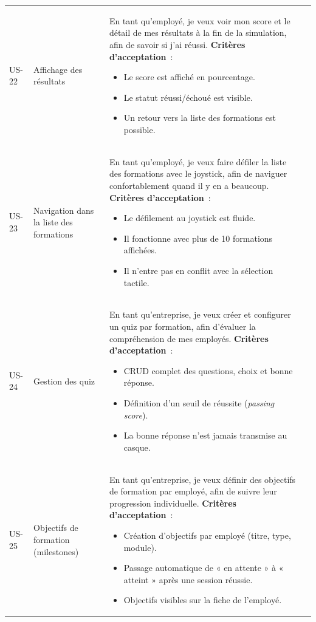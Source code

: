 \begin{longtable}{lp{2.8cm}p{8cm}l}
  US-22 & Affichage des résultats &
    En tant qu'employé, je veux voir mon score et le détail de mes
    résultats à la fin de la simulation, afin de savoir si j'ai
    réussi.
    \newline\textbf{Critères d'acceptation}~:
    \begin{itemize}
      \item Le score est affiché en pourcentage.
      \item Le statut réussi/échoué est visible.
      \item Un retour vers la liste des formations est possible.
    \end{itemize}
    & \must{} \\[4pt]

  US-23 & Navigation dans la liste des formations &
    En tant qu'employé, je veux faire défiler la liste des formations
    avec le joystick, afin de naviguer confortablement quand il y en
    a beaucoup.
    \newline\textbf{Critères d'acceptation}~:
    \begin{itemize}
      \item Le défilement au joystick est fluide.
      \item Il fonctionne avec plus de 10 formations affichées.
      \item Il n'entre pas en conflit avec la sélection tactile.
    \end{itemize}
    & \could{} \\

    US-24 & Gestion des quiz &
    En tant qu'entreprise, je veux créer et configurer un quiz par
    formation, afin d'évaluer la compréhension de mes employés.
    \newline\textbf{Critères d'acceptation}~:
    \begin{itemize}
      \item CRUD complet des questions, choix et bonne réponse.
      \item Définition d'un seuil de réussite (\textit{passing score}).
      \item La bonne réponse n'est jamais transmise au casque.
    \end{itemize}
    & \must{} \\[4pt]

  US-25 & Objectifs de formation (milestones) &
    En tant qu'entreprise, je veux définir des objectifs de formation
    par employé, afin de suivre leur progression individuelle.
    \newline\textbf{Critères d'acceptation}~:
    \begin{itemize}
      \item Création d'objectifs par employé (titre, type, module).
      \item Passage automatique de « en attente » à « atteint » après une
        session réussie.
      \item Objectifs visibles sur la fiche de l'employé.
    \end{itemize}
    & \should{} \\[4pt]
\end{longtable}

